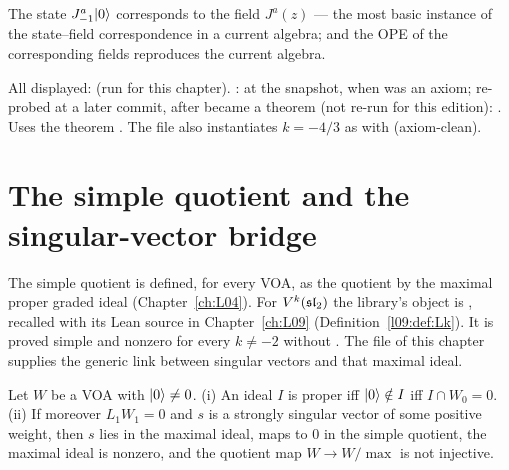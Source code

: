 \begin{physics}
The state $J^a_{-1}|0\rangle$ corresponds to the field $J^a(z)$ --- the most basic instance of the
state--field correspondence in a current algebra; and the OPE of the corresponding fields reproduces
the current algebra.
\end{physics}

\begin{status}
All displayed: \lean{[propext, Classical.}\allowbreak{}\allowbreak\lean{sound]} (run for this chapter).
\allowbreak{}\allowbreak{}\allowbreak{}\allowbreak{}\allowbreak{}\allowbreak{}: \lean{[propext, Classical.}\allowbreak{}\allowbreak{}\allowbreak\lean{pbw]} at the snapshot, when  was an axiom; re-probed at a later commit, after  became a theorem (not re-run for this edition):
. Uses the theorem . The file also instantiates $k=-4/3$ as  with
\allowbreak{}\allowbreak{} (axiom-clean).
\end{status}

\section{The simple quotient and the singular-vector bridge}\label{l08:sec:simple}

The simple quotient is defined, for every VOA, as the quotient by the maximal proper graded ideal
 (Chapter~\ref{ch:L04}). For $V^k(\mathfrak{sl}_2)$ the library's object is
\allowbreak{}\allowbreak{}\allowbreak{}, recalled
with its Lean source in Chapter~\ref{ch:L09} (Definition~\ref{l09:def:Lk}). It is proved simple and
nonzero for every $k\ne-2$ without . The file 
of this chapter supplies the generic link between singular vectors and that maximal ideal.

\begin{theorem}\label{l08:thm:bridge}
Let $W$ be a VOA with $|0\rangle\ne0$. (i) An ideal $I$ is proper iff $|0\rangle\notin I$ iff
$I\cap W_0 = 0$. (ii) If moreover $L_1W_1 = 0$ and $s$ is a strongly singular vector of some
positive weight, then $s$ lies in the maximal ideal, maps to $0$ in the simple quotient, the maximal
ideal is nonzero, and the quotient map $W\to W/\max$ is not injective.
\end{theorem}


